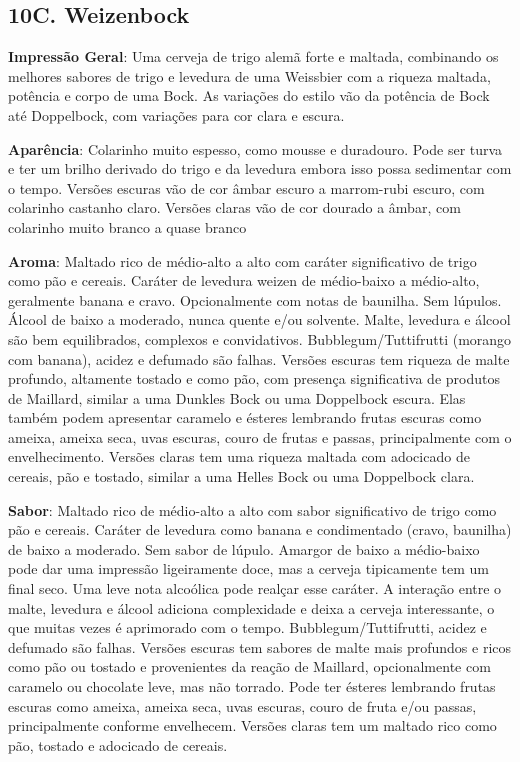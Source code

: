 \subsection*{10C. Weizenbock}
\textbf{Impressão Geral}: Uma cerveja de trigo alemã forte e maltada, combinando os melhores sabores de trigo e levedura de uma Weissbier com a riqueza maltada, potência e corpo de uma Bock. As variações do estilo vão da potência de Bock até Doppelbock, com variações para cor clara e escura.

\textbf{Aparência}: Colarinho muito espesso, como mousse e duradouro. Pode ser turva e ter um brilho derivado do trigo e da levedura embora isso possa sedimentar com o tempo.
Versões escuras vão de cor âmbar escuro a marrom-rubi escuro, com colarinho castanho claro.
Versões claras vão de cor dourado a âmbar, com colarinho muito branco a quase branco

\textbf{Aroma}: Maltado rico de médio-alto a alto com caráter significativo de trigo como pão e cereais. Caráter de levedura weizen de médio-baixo a médio-alto, geralmente banana e cravo. Opcionalmente com notas de baunilha. Sem lúpulos. Álcool de baixo a moderado, nunca quente e/ou solvente. Malte, levedura e álcool são bem equilibrados, complexos e convidativos. Bubblegum/Tuttifrutti (morango com banana), acidez e defumado são falhas.
Versões escuras tem riqueza de malte profundo, altamente tostado e como pão, com presença significativa de produtos de Maillard, similar a uma Dunkles Bock ou uma Doppelbock escura. Elas também podem apresentar caramelo e ésteres lembrando frutas escuras como ameixa, ameixa seca, uvas escuras, couro de frutas e passas, principalmente com o envelhecimento.
Versões claras tem uma riqueza maltada com adocicado de cereais, pão e tostado, similar a uma Helles Bock ou uma Doppelbock clara.

\textbf{Sabor}: Maltado rico de médio-alto a alto com sabor significativo de trigo como pão e cereais. Caráter de levedura como banana e condimentado (cravo, baunilha) de baixo a moderado. Sem sabor de lúpulo. Amargor de baixo a médio-baixo pode dar uma impressão ligeiramente doce, mas a cerveja tipicamente tem um final seco. Uma leve nota alcoólica pode realçar esse caráter. A interação entre o malte, levedura e álcool adiciona complexidade e deixa a cerveja interessante, o que muitas vezes é aprimorado com o tempo. Bubblegum/Tuttifrutti, acidez e defumado são falhas.
Versões escuras tem sabores de malte mais profundos e ricos como pão ou tostado e provenientes da reação de Maillard, opcionalmente com caramelo ou chocolate leve, mas não torrado. Pode ter ésteres lembrando frutas escuras como ameixa, ameixa seca, uvas escuras, couro de fruta e/ou passas, principalmente conforme envelhecem.
Versões claras tem um maltado rico como pão, tostado e adocicado de cereais.

